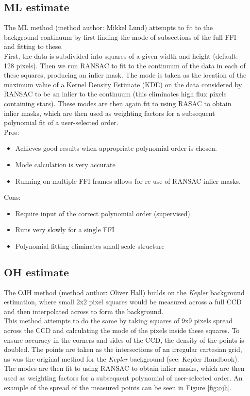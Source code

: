 \documentclass[10pt, a4paper]{article}
\begin{document}
\subsection{ML estimate}
The ML method (method author: Mikkel Lund) attempts to fit to the background continuum by first finding the mode of subsections of the full FFI and fitting to these.\\

First, the data is subdivided into squares of a given width and height (default: 128 pixels). Then we run RANSAC to fit to the continuum of the data in each of these squares, producing an inlier mask. The mode is taken as the location of the maximum value of a Kernel Density Estimate (KDE) on the data considered by RANSAC to be an inlier to the continuum (this eliminates high flux pixels containing stars). These modes are then again fit to using RASAC to obtain inlier masks, which are then used as weighting factors for a subsequent polynomial fit of a user-selected order.\\

Pros:
\begin{itemize}
\item Achieves good results when appropriate polynomial order is chosen.
\item Mode calculation is very accurate
\item Running on multiple FFI frames allows for re-use of RANSAC inlier masks.
\end{itemize}

Cons:
\begin{itemize}
\item Require input of the correct polynomial order (supervised)
\item Runs very slowly for a single FFI
\item Polynomial fitting eliminates small scale structure
\end{itemize}

\subsection{OH estimate}
The OJH method (method author: Oliver Hall) builds on the \textit{Kepler} background estimation, where small 2x2 pixel squares would be measured across a full CCD and then interpolated across to form the background.\\

This method attempts to do the same by taking squares of 9x9 pixels spread across the CCD and calculating the mode of the pixels inside these squares. To ensure accuracy in the corners and sides of the CCD, the density of the points is doubled. The points are taken as the intersections of an irregular cartesian grid, as was the original method for the \textit{Kepler} background (see: Kepler Handbook). The modes are then fit to using RANSAC to obtain inlier masks, which are then used as weighting factors for a subsequent polynomial of user-selected order. An example of the spread of the measured points can be seen in Figure \ref{fig:ojh}.
\end{document}
